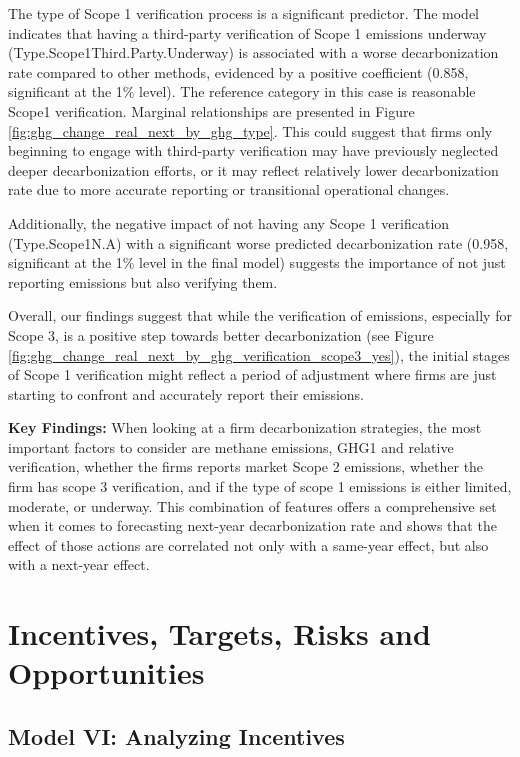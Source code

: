 The type of Scope 1 verification process is a significant predictor. The model indicates that having a third-party verification of Scope 1 emissions underway \\ (Type.Scope1Third.Party.Underway) is associated with a worse decarbonization rate compared to other methods, evidenced by a positive coefficient (0.858, significant at the 1\% level). The reference category in this case is reasonable Scope1 verification. Marginal relationships are presented in Figure \ref{fig:ghg_change_real_next_by_ghg_type}. This could suggest that firms only beginning to engage with third-party verification may have previously neglected deeper decarbonization efforts, or it may reflect relatively lower decarbonization rate due to more accurate reporting or transitional operational changes.
    

Additionally, the negative impact of not having any Scope 1 verification \\ (Type.Scope1N.A) with a significant worse predicted decarbonization rate (0.958, significant at the 1\% level in the final model) suggests the importance of not just reporting emissions but also verifying them.


Overall, our findings suggest that while the verification of emissions, especially for Scope 3, is a positive step towards better decarbonization (see Figure \ref{fig:ghg_change_real_next_by_ghg_verification_scope3_yes}), the initial stages of Scope 1 verification might reflect a period of adjustment where firms are just starting to confront and accurately report their emissions.
    

\textbf{Key Findings:} When looking at a firm decarbonization strategies, the most important factors to consider are methane emissions, GHG1 and relative verification, whether the firms reports market Scope 2 emissions, whether the firm has scope 3 verification, and if the type of scope 1 emissions is either limited, moderate, or underway. This combination of features offers a comprehensive set when it comes to forecasting next-year decarbonization rate and shows that the effect of those actions are correlated not only with a same-year effect, but also with a next-year effect.
    

\section{Incentives, Targets, Risks and Opportunities}

\subsection{Model VI: Analyzing Incentives}

